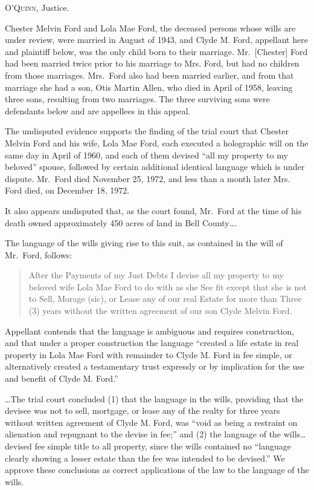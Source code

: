 

\opinion \textsc{O'Quinn}, Justice.

Chester Melvin Ford and Lola Mae Ford, the deceased persons whose wills are
under review, were married in August of 1943, and Clyde M. Ford, appellant here
and plaintiff below, was the only child born to their marriage. Mr.\ [Chester]
Ford had been married twice prior to his marriage to Mrs. Ford, but had no
children from those marriages. Mrs.\ Ford also had been married earlier, and
from that marriage she had a son, Otis Martin Allen, who died in April of 1958,
leaving three sons, resulting from two marriages. The three surviving sons were
defendants below and are appellees in this appeal.

The undisputed evidence supports the finding of the trial court that Chester
Melvin Ford and his wife, Lola Mae Ford, each executed a holographic will on
the same day in April of 1960, and each of them devised ``all my property to my
beloved'' spouse, followed by certain additional identical language which is
under dispute. Mr.\ Ford died November 25, 1972, and less than a month later
Mrs. Ford died, on December 18, 1972.

It also appears undisputed that, as the court found, Mr.\ Ford at the time of
his death owned approximately 450 acres of land in Bell County\dots.

The language of the wills giving rise to this suit, as contained in the will of
Mr.\ Ford, follows:
\begin{quote}
After the Payments of my Just Debts I devise all my property to my beloved
wife Lola Mae Ford to do with as she See fit except that she is not to Sell,
Morage (sic), or Lease any of our real Estate for more than Three (3) years
without the written agreement of our son Clyde Melvin Ford.
\end{quote}
Appellant contends that the language is ambiguous and requires construction, and
that under a proper construction the language ``created a life estate in real
property in Lola Mae Ford with remainder to Clyde M. Ford in fee simple, or
alternatively created a testamentary trust expressly or by implication for the
use and benefit of Clyde M. Ford.''

\dots The trial court concluded (1) that the language in the wills, providing
that the devisee was not to sell, mortgage, or lease any of the realty for
three years without written agreement of Clyde M. Ford, was ``void as being a
restraint on alienation and repugnant to the devise in fee;'' and (2) the
language of the wills\dots devised fee simple title to all property, since
the wills contained no ``language clearly showing a lesser estate than the fee
was intended to be devised.'' We approve these conclusions as correct
applications of the law to the language of the wills.

